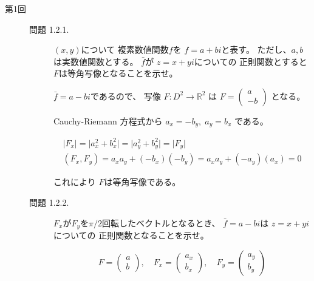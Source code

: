 \documentclass[12pt,b5paper]{ltjsarticle}
\begin{document}
\begin{description}
 \item[第1回]
 \begin{description}
  \item[問題 1.2.1.]
             $(x,y)$について
            複素数値関数$f$を
            $f=a+bi$と表す。
            ただし、$a,b$は実数値関数とする。
            $\bar{f}$が
            $z=x+yi$についての
            正則関数とすると
            $F$は等角写像となることを示せ。

\dotfill


             $\bar{f}=a-bi$であるので、
             写像
             $F:D^{2}\to\mathbb{R}^{2}$
             は
             $F=\begin{pmatrix}a\\-b \end{pmatrix}$
             となる。

             Cauchy-Riemann 方程式から
             $a_{x}=-b_{y},\; a_{y}=b_{x}$
             である。

             \begin{gather}
              \lvert F_{x} \rvert
              = \lvert a_{x}^{2} + b_{x}^{2} \rvert
              = \lvert a_{y}^{2} + b_{y}^{2} \rvert
              = \lvert F_{y} \rvert
              \\
              (F_{x},F_{y})
              = a_{x}a_{y}+(-b_{x})(-b_{y})
              = a_{x}a_{y}+(-a_{y})(a_{x})
              = 0
             \end{gather}

             これにより
             $F$は等角写像である。

\hrulefill


 \item[問題 1.2.2.]
            $F_{x}$が$F_{y}$を$\pi/2$回転したベクトルとなるとき、
            $\bar{f}=a-bi$は
            $z=x+yi$についての
            正則関数となることを示せ。

\dotfill


\begin{equation}
 F=\begin{pmatrix} a \\ b \end{pmatrix}
 ,\quad
 F_{x}=\begin{pmatrix} a_{x} \\ b_{x} \end{pmatrix}
 ,\quad
 F_{y}=\begin{pmatrix} a_{y} \\ b_{y} \end{pmatrix}
\end{equation}


\end{description}
\end{description}
\end{document}
